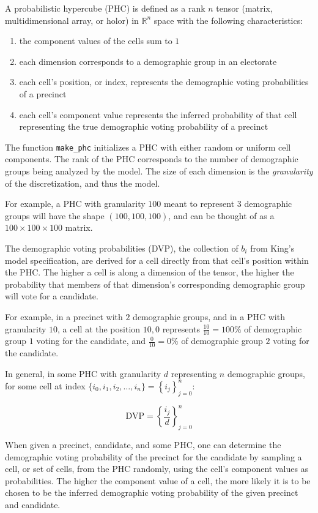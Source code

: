 A probabilistic hypercube (PHC) is defined as a rank $n$ tensor (matrix, multidimensional array, or holor) in $\mathbb{R}^n$ space with the following characteristics:
\begin{enumerate}
  \item the component values of the cells sum to $1$
  \item each dimension corresponds to a demographic group in an electorate
  \item each cell's position, or index, represents the demographic voting probabilities of a precinct
  \item each cell's component value represents the inferred probability of that cell representing the true demographic voting probability of a precinct
\end{enumerate}

The function \texttt{make\_phc} initializes a PHC with either random or uniform cell components. The rank of the PHC corresponds to the number of demographic groups being analyzed by the model. The size of each dimension is the \textit{granularity} of the discretization, and thus the model.

For example, a PHC with granularity $100$ meant to represent $3$ demographic groups will have the shape $(100, 100, 100)$, and can be thought of as a $100 \times 100 \times 100$ matrix.

The demographic voting probabilities (DVP), the collection of $b_i$ from King's model specification, are derived for a cell directly from that cell's position within the PHC. The higher a cell is along a dimension of the tensor, the higher the probability that members of that dimension's corresponding demographic group will vote for a candidate.

For example, in a precinct with $2$ demographic groups, and in a PHC with granularity $10$, a cell at the position $10, 0$ represents $\frac{10}{10} = 100 \%$ of demographic group $1$ voting for the candidate, and $\frac{0}{10} = 0 \%$ of demographic group $2$ voting for the candidate.

In general, in some PHC with granularity $d$ representing $n$ demographic groups, for some cell at index $\{i_0, i_1, i_2, \dots, i_n\} = \left\{i_j\right\}_{j=0}^n$:

$$\text{DVP} = \left\{\frac{i_j}{d}\right\}_{j=0}^n$$

When given a precinct, candidate, and some PHC, one can determine the demographic voting probability of the precinct for the candidate by sampling a cell, or set of cells, from the PHC randomly, using the cell's component values as probabilities. The higher the component value of a cell, the more likely it is to be chosen to be the inferred demographic voting probability of the given precinct and candidate.

